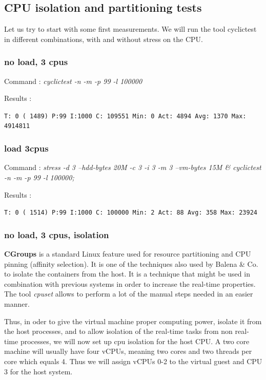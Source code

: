 \documentclass[]{scrartcl}
\begin{document}
\subsection{CPU isolation and partitioning tests}

Let us try to start with some first measurements. We will run the tool cyclictest in different combinations, with and without stress on the CPU.

\subsubsection{no load, 3 cpus}

\noindent Command : \textit{cyclictest -n -m -p 99 -l 100000}

\noindent Results :

\noindent \texttt{T: 0 ( 1489) P:99 I:1000 C: 109551 Min:      0 Act: 4894 Avg: 1370 Max:  4914811}

\subsubsection{load 3cpus}

\noindent Command : \textit{stress -d 3 --hdd-bytes 20M -c 3 -i 3 -m 3 --vm-bytes 15M \& cyclictest -n -m -p 99 -l 100000;}

\noindent Results :

\noindent \texttt{T: 0 ( 1514) P:99 I:1000 C: 100000 Min:      2 Act:   88 Avg:  358 Max:   23924}

\subsubsection{no load, 3 cpus, isolation}

\textbf{CGroups} is a standard Linux feature used for resource partitioning and CPU pinning (affinity selection). It is one of the techniques also used by Balena \& Co. to isolate the containers from the host. It is a technique that might be used in combination with previous systems in order to increase the real-time properties. The tool \textit{cpuset} allows to perform a lot of the manual steps needed in an easier manner. 

Thus, in oder to give the virtual machine proper computing power, isolate it from the host processes, and to allow isolation of the real-time tasks from non real-time processes, we will now set up cpu isolation for the host CPU. A two core machine will usually have four vCPUs, meaning two cores and two threads per core which equals 4. Thus we will assign vCPUs 0-2 to the virtual guest and CPU 3 for the host system.
\end{document}
